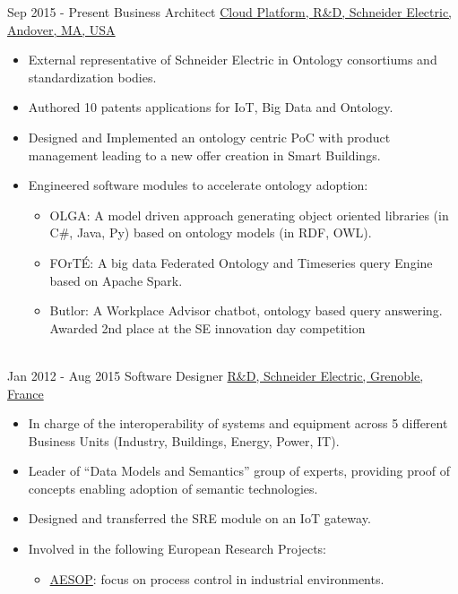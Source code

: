 \documentclass[letterpaper]{twentysecondcv} %
\begin{document}
\begin{twenty} %
\twentyitem
{Sep 2015 -}
{Present}
{Business Architect}
{\href{http://www.schneider-electric.com}{Cloud Platform, R\&D, Schneider Electric, Andover, MA, USA}}
{}
{
\begin{itemize}
\item External representative of Schneider Electric in Ontology consortiums and standardization bodies.
\item Authored 10 patents applications for IoT, Big Data and Ontology.
\item Designed and Implemented an ontology centric PoC with product management leading to a new offer creation in Smart Buildings.
\item Engineered software modules to accelerate ontology adoption: 
\begin{itemize}
\item  OLGA: A model driven approach generating object oriented libraries (in C\#, Java, Py) based on ontology models (in RDF, OWL). 
\item FOrT\'{E}: A big data Federated Ontology and Timeseries query Engine based on Apache Spark.
\item Butlor: A Workplace Advisor chatbot, ontology based query answering. Awarded 2nd place at the SE innovation day competition
\end{itemize}
\end{itemize}}
\\
\twentyitem
{Jan 2012 -}
{Aug 2015}
{Software Designer}
{\href{http://www.schneider-electric.com}{R\&D, Schneider Electric, Grenoble, France}}
{}
{
\begin{itemize}
\item In charge of the interoperability of systems and equipment across 5 different Business Units (Industry, Buildings, Energy, Power, IT).
\item Leader of “Data Models and Semantics” group of experts, providing proof of concepts enabling adoption of semantic technologies.
\item Designed and transferred the SRE module on an IoT gateway.
\item Involved in the following European Research Projects:
\begin{itemize}
\item \href{http://www.imc-aesop.eu/}{AESOP}: focus on process control in industrial environments.

\end{itemize}
\end{itemize}}
\end{twenty}
\end{document}
